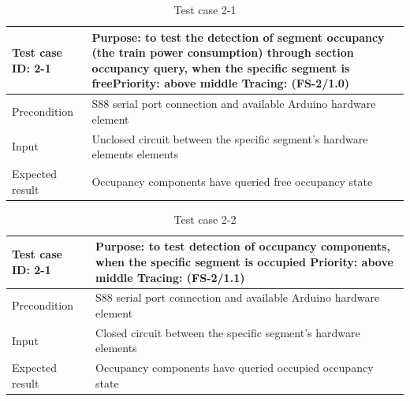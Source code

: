 \begin{table}[H]
	\caption{Test case 2-1}
	\label{table:TCase-FS2-1}
	\begin{center}
		\renewcommand{\arraystretch}{1.8}
		\begin{tabu} 
			to 0.9 \textwidth
			{  X[0.3, l] X[l] }
			\toprule
			Test case ID: 2-1 & Purpose: to test the detection of segment occupancy (the train power consumption) through section occupancy query, when the specific segment is free\newline Priority: above middle \newline Tracing: (FS-2/1.0) \\ \midrule
			Precondition      & S88 serial port connection and available Arduino hardware element                                                                                                                                                \\
			Input             & Unclosed circuit between the specific segment's hardware elements elements                                                                                                                                       \\
			Expected result   & Occupancy components have queried free occupancy state                                                                                                                                                           \\ \bottomrule
		\end{tabu}
	\end{center}
\end{table} 

\begin{table}[H]
	\caption{Test case 2-2}
	\label{table:TCase-FS2-2}
	\begin{center}
		\renewcommand{\arraystretch}{1.8}
		\begin{tabu} 
			to 0.9 \textwidth
			{  X[0.3, l] X[l] }
			\toprule
			Test case ID: 2-1 & Purpose: to test detection of occupancy components, when the specific segment is occupied \newline Priority: above middle \newline Tracing: (FS-2/1.1) \\ \midrule
			Precondition      & S88 serial port connection and available Arduino hardware element                                                                                      \\
			Input             & Closed circuit between the specific segment's hardware elements                                                                                        \\
			Expected result   & Occupancy components have queried occupied occupancy state                                                                                             \\ \bottomrule
		\end{tabu}
	\end{center}
\end{table} 

